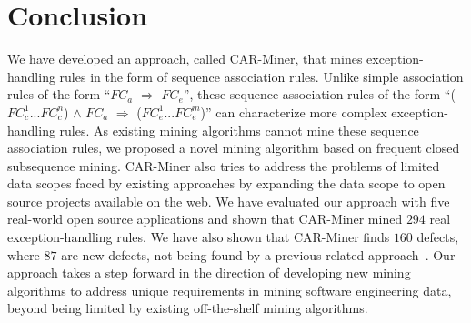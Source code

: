 \section{Conclusion}
\label{sec:conclusion}
\vspace*{-2ex}
We have developed an approach, called CAR-Miner, that mines exception-handling 
rules in the form of sequence association rules. Unlike simple association
rules of the form ``$FC_a$ $\Rightarrow$ $FC_e$'', these sequence association rules
of the form ``($FC_c^1$...$FC_c^n$) $\wedge$ $FC_a$ $\Rightarrow$ ($FC_e^1$...$FC_e^m$)''
can characterize more complex exception-handling rules. As existing
mining algorithms cannot mine these sequence association rules, we proposed a novel mining
algorithm based on frequent closed subsequence mining. CAR-Miner
also tries to address the problems of limited data scopes faced 
by existing approaches by expanding the data scope to open source projects available on the web.
We have evaluated our approach with five real-world open source applications
and shown that CAR-Miner mined $294$ real exception-handling rules. 
We have also shown that CAR-Miner finds $160$ defects, where $87$ are new defects,
not being found by a previous related approach~\cite{WeimerN05}. 
Our approach takes a step forward in the direction 
of developing new mining algorithms to address
unique requirements in mining software engineering data, beyond being limited
by existing off-the-shelf mining algorithms.